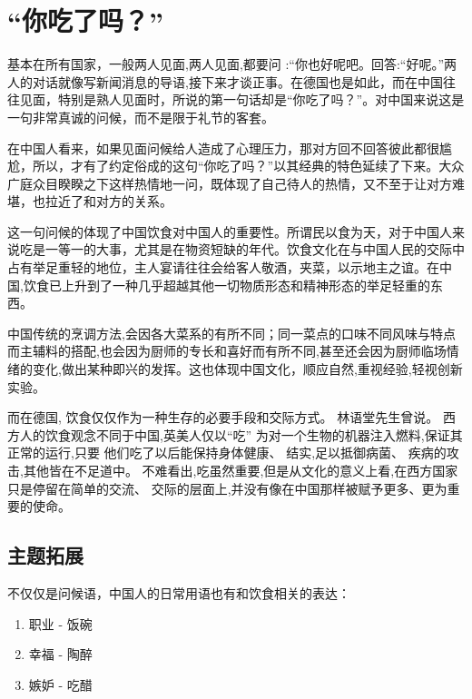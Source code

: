 \section{“你吃了吗？”}
基本在所有国家，一般两人见面,两人见面,都要问 :“你也好呢吧。回答:“好呢。”两人的对话就像写新闻消息的导语,接下来才谈正事。在德国也是如此，而在中国往往见面，特别是熟人见面时，所说的第一句话却是“你吃了吗？”。对中国来说这是一句非常真诚的问候，而不是限于礼节的客套。

在中国人看来，如果见面问候给人造成了心理压力，那对方回不回答彼此都很尴尬，所以，才有了约定俗成的这句“你吃了吗？”以其经典的特色延续了下来。大众广庭众目睽睽之下这样热情地一问，既体现了自己待人的热情，又不至于让对方难堪，也拉近了和对方的关系。

这一句问候的体现了中国饮食对中国人的重要性。所谓民以食为天，对于中国人来说吃是一等一的大事，尤其是在物资短缺的年代。饮食文化在与中国人民的交际中占有举足重轻的地位，主人宴请往往会给客人敬酒，夹菜，以示地主之谊。在中国,饮食已上升到了一种几乎超越其他一切物质形态和精神形态的举足轻重的东西。

中国传统的烹调方法,会因各大菜系的有所不同；同一菜点的口味不同风味与特点而主辅料的搭配,也会因为厨师的专长和喜好而有所不同,甚至还会因为厨师临场情绪的变化,做出某种即兴的发挥。这也体现中国文化，顺应自然,重视经验,轻视创新实验。

而在德国, 饮食仅仅作为一种生存的必要手段和交际方式。 林语堂先生曾说。 西方人的饮食观念不同于中国,英美人仅以“吃” 为对一个生物的机器注入燃料,保证其正常的运行,只要 他们吃了以后能保持身体健康、 结实,足以抵御病菌、 疾病的攻击,其他皆在不足道中。 不难看出,吃虽然重要,但是从文化的意义上看,在西方国家只是停留在简单的交流、 交际的层面上,并没有像在中国那样被赋予更多、更为重要的使命。

\subsection{ 主题拓展}
不仅仅是问候语，中国人的日常用语也有和饮食相关的表达：
\begin{enumerate}
\item 
职业 - 饭碗
\item
 幸福 - 陶醉
\item
 嫉妒 - 吃醋
\end{enumerate}